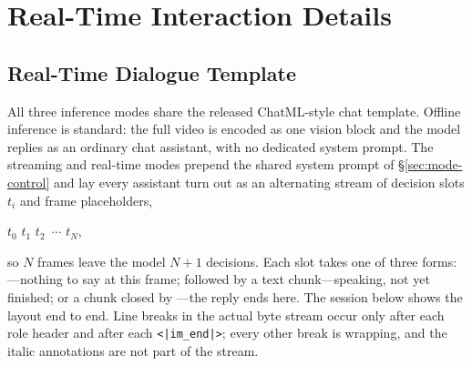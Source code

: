 \section{Real-Time Interaction Details}

\subsection{Real-Time Dialogue Template}\label{app:template}


All three inference modes share the released ChatML-style chat template.
Offline inference is standard: the full video is encoded as one vision
block and the model replies as an ordinary chat assistant, with no
dedicated system prompt. The streaming and real-time modes prepend the
shared system prompt of \S\ref{sec:mode-control} and lay every
assistant turn out as an alternating stream of decision slots $t_i$ and
frame placeholders,
\begin{center}
$t_0$\,\,$t_1$\,\,$t_2$%
\,$\cdots$\,\,$t_N$,
\end{center}
so $N$ frames leave the model $N{+}1$ decisions. Each slot takes one of
three forms: ---nothing to say at this frame;
 followed by a text chunk---speaking, not yet
finished; or a chunk closed by ---the reply ends
here. The session below shows the layout end to end. Line breaks in the
actual byte stream occur only after each role header and after each
\texttt{<|im\_end|>}; every other break is wrapping, and the italic
annotations are not part of the stream.

